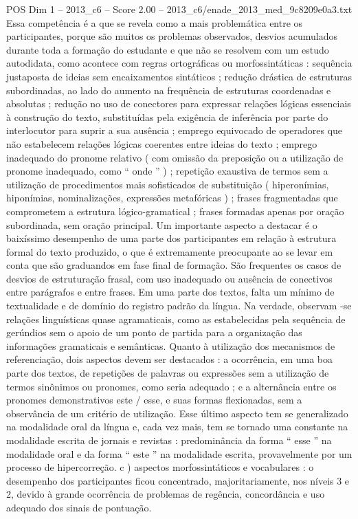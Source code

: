 \begin{textsample}{POS Dim 1 – 2013\_c6 – Score 2.00 – 2013\_c6/enade\_2013\_med\_9c8209e0a3.txt}
Essa competência é a que se revela como a mais problemática entre os participantes, porque são muitos os problemas observados, desvios acumulados durante toda a formação do estudante e que não se resolvem com um estudo autodidata, como acontece com regras ortográficas ou morfossintáticas : sequência justaposta de ideias sem encaixamentos sintáticos ; redução drástica de estruturas subordinadas, ao lado do aumento na frequência de estruturas coordenadas e absolutas ; redução no uso de conectores para expressar relações lógicas essenciais à construção do texto, substituídas pela exigência de inferência por parte do interlocutor para suprir a sua ausência ; emprego equivocado de operadores que não estabelecem relações lógicas coerentes entre ideias do texto ; emprego inadequado do pronome relativo ( com omissão da preposição ou a utilização de pronome inadequado, como “ onde ” ) ; repetição exaustiva de termos sem a utilização de procedimentos mais sofisticados de substituição ( hiperonímias, hiponímias, nominalizações, expressões metafóricas ) ; frases fragmentadas que comprometem a estrutura lógico-gramatical ; frases formadas apenas por oração subordinada, sem oração principal.
Um importante aspecto a destacar é o baixíssimo desempenho de uma parte dos participantes em relação à estrutura formal do texto produzido, o que é extremamente preocupante ao se levar em conta que são graduandos em fase final de formação.
São frequentes os casos de desvios de estruturação frasal, com uso inadequado ou ausência de conectivos entre parágrafos e entre frases.
Em uma parte dos textos, falta um mínimo de textualidade e de domínio do registro padrão da língua.
Na verdade, observam -se relações linguísticas quase agramaticais, como as estabelecidas pela sequência de gerúndios sem o apoio de um ponto de partida para a organização das informações gramaticais e semânticas.
Quanto à utilização dos mecanismos de referenciação, dois aspectos devem ser destacados : a ocorrência, em uma boa parte dos textos, de repetições de palavras ou expressões sem a utilização de termos sinônimos ou pronomes, como seria adequado ; e a alternância entre os pronomes demonstrativos este / esse, e suas formas flexionadas, sem a observância de um critério de utilização.
Esse último aspecto tem se generalizado na modalidade oral da língua e, cada vez mais, tem se tornado uma constante na modalidade escrita de jornais e revistas : predominância da forma “ esse ” na modalidade oral e da forma “ este ” na modalidade escrita, provavelmente por um processo de hipercorreção. c ) aspectos morfossintáticos e vocabulares : o desempenho dos participantes ficou concentrado, majoritariamente, nos níveis 3 e 2, devido à grande ocorrência de problemas de regência, concordância e uso adequado dos sinais de pontuação.

\end{textsample}
